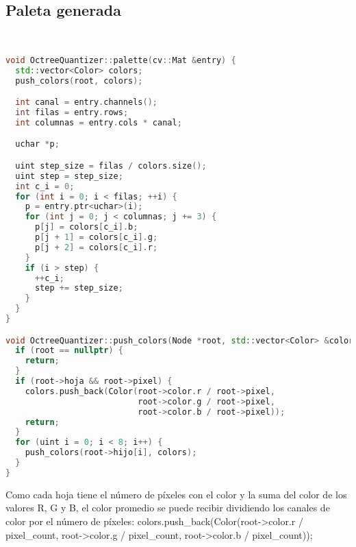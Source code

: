 \subsection{Paleta generada}
\\

\begin{lstlisting}[language=C++,
                   directivestyle={\color{black}}
                   emph={int,char,double,float,unsigned},
                   emphstyle={\color{blue}}
                  ]
void OctreeQuantizer::palette(cv::Mat &entry) {
  std::vector<Color> colors;
  push_colors(root, colors);

  int canal = entry.channels();
  int filas = entry.rows;
  int columnas = entry.cols * canal;

  uchar *p;

  uint step_size = filas / colors.size();
  uint step = step_size;
  int c_i = 0;
  for (int i = 0; i < filas; ++i) {
    p = entry.ptr<uchar>(i);
    for (int j = 0; j < columnas; j += 3) {
      p[j] = colors[c_i].b;
      p[j + 1] = colors[c_i].g;
      p[j + 2] = colors[c_i].r;
    }
    if (i > step) {
      ++c_i;
      step += step_size;
    }
  }
}

void OctreeQuantizer::push_colors(Node *root, std::vector<Color> &colors) {
  if (root == nullptr) {
    return;
  }
  if (root->hoja && root->pixel) {
    colors.push_back(Color(root->color.r / root->pixel,
                           root->color.g / root->pixel,
                           root->color.b / root->pixel));
    return;
  }
  for (uint i = 0; i < 8; i++) {
    push_colors(root->hijo[i], colors);
  }
}
\end{lstlisting}
Como cada hoja tiene el número de píxeles con el color y la suma del color de los valores R, G y B, el color promedio se puede recibir dividiendo los canales de color por el número de píxeles: colors.push\_back(Color(root->color.r / pixel\_count, root->color.g / pixel\_count, root->color.b / pixel\_count));